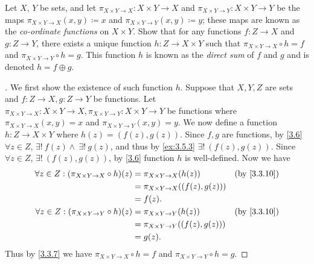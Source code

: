 \begin{ex}\label{ex:3.5.7}
	Let \(X\), \(Y\) be sets, and let \(\pi_{X \times Y \to X} : X \times Y \to X\) and \(\pi_{X \times Y \to Y} : X \times Y \to Y\) be the maps \(\pi_{X \times Y \to X}(x, y) \coloneqq x\) and \(\pi_{X \times Y \to Y}(x, y) \coloneqq y\);
	these maps are known as the \emph{co-ordinate functions} on \(X \times Y\).
	Show that for any functions \(f : Z \to X\) and \(g : Z \to Y\), there exists a unique function \(h : Z \to X \times Y\) such that \(\pi_{X \times Y \to X} \circ h = f\) and \(\pi_{X \times Y \to Y} \circ h = g\).
	This function \(h\) is known as the \emph{direct sum} of \(f\) and \(g\) and is denoted \(h = f \oplus g\).
\end{ex}

\begin{proof}[]
	We first show the existence of such function \(h\).
	Suppose that \(X, Y, Z\) are sets and \(f : Z \to X, g : Z \to Y\) be functions.
	Let \(\pi_{X \times Y \to X} : X \times Y \to X, \pi_{X \times Y \to Y} : X \times Y \to Y\) be functions where \(\pi_{X \times Y \to X}(x, y) = x\) and \(\pi_{X \times Y \to Y}(x, y) = y\).
	We now define a function \(h : Z \to X \times Y\) where \(h(z) = (f(z), g(z))\).
	Since \(f, g\) are functions, by \cref{3.6} \(\forall z \in Z\), \(\exists!\ f(z) \land \ \exists!\ g(z)\), and thus by \cref{ex:3.5.3} \(\exists!\ (f(z), g(z))\).
	Since \(\forall z \in Z\), \(\exists!\ (f(z), g(z))\), by \cref{3.6} function \(h\) is well-defined.
	Now we have
	\begin{align*}
		\forall z \in Z : (\pi_{X \times Y \to X} \circ h)(z) & = \pi_{X \times Y \to X}(h(z))         &  & \by{3.3.10} \\
		                                                      & = \pi_{X \times Y \to X}((f(z), g(z)))                  \\
		                                                      & = f(z).                                                 \\
		\forall z \in Z : (\pi_{X \times Y \to Y} \circ h)(z) & = \pi_{X \times Y \to Y}(h(z))         &  & \by{3.3.10} \\
		                                                      & = \pi_{X \times Y \to Y}((f(z), g(z)))                  \\
		                                                      & = g(z).
	\end{align*}
	Thus by \cref{3.3.7} we have \(\pi_{X \times Y \to X} \circ h = f\) and \(\pi_{X \times Y \to Y} \circ h = g\).


\end{proof}
